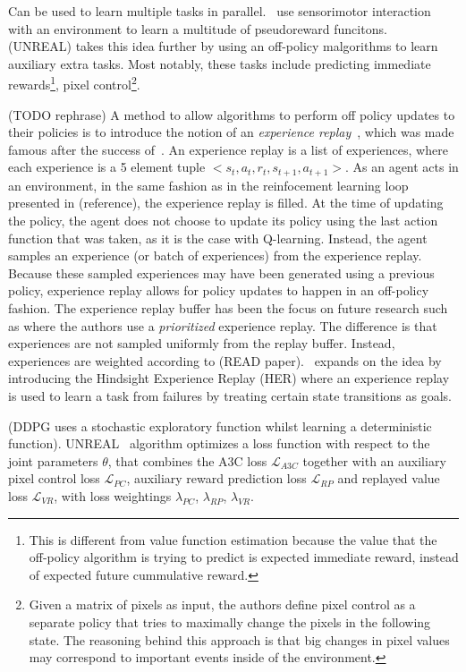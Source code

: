 \documentclass{../main.tex}{}
\begin{document}
Can be used to learn multiple tasks in parallel.~\cite{Sutton2010} use sensorimotor interaction with an environment to learn a multitude of pseudoreward funcitons.~\cite{Jaderberg2016} (UNREAL) takes this idea further by using an off-policy malgorithms to learn auxiliary extra tasks. Most notably, these tasks include predicting immediate rewards\footnote{This is different from value function estimation because the value that the off-policy algorithm is trying to predict is expected immediate reward, instead of expected future cummulative reward.}, pixel control\footnote{Given a matrix of pixels as input, the authors define pixel control as a separate policy that tries to maximally change the pixels in the following state. The reasoning behind this approach is that big changes in pixel values may correspond to important events inside of the environment.}.

(TODO rephrase)
A method to allow algorithms to perform off policy updates to their policies is to introduce the notion of an \textit{experience replay}~\citep{Lin1993}, which was made famous after the success of~\cite{Mnih2013}. An experience replay is a list of experiences, where each experience is a 5 element tuple $<s_t, a_t, r_t, s_{t+1}, a_{t+1}>$. As an agent acts in an environment, in the same fashion as in the reinfocement learning loop presented in (reference), the experience replay is filled. At the time of updating the policy, the agent does not choose to update its policy using the last action function that was taken, as it is the case with Q-learning. Instead, the agent samples an experience (or batch of experiences) from the experience replay. Because these sampled experiences may have been generated using a previous policy, experience replay allows for policy updates to happen in an off-policy fashion. The experience replay buffer has been the focus on future research such as \citep{Schaul2015, Hessel2017} where the authors use a \textit{prioritized} experience replay. The difference is that experiences are not sampled uniformly from the replay buffer. Instead, experiences are weighted according to (READ paper).~\cite{Andrychowicz2017} expands on the idea by introducing the Hindsight Experience Replay (HER) where an experience replay is used to learn a task from failures by treating certain state transitions as goals.

(DDPG uses a stochastic exploratory function whilst learning a deterministic function).
UNREAL~\citep{Jaderberg2016} algorithm optimizes a loss function with respect to the joint parameters $\theta$, that combines the A3C loss $\mathcal{L}_{A3C}$ together with an auxiliary pixel control loss $\mathcal{L}_{PC}$, auxiliary reward prediction loss $\mathcal{L}_{RP}$ and replayed value loss $\mathcal{L}_{VR}$, with loss weightings $\lambda_{PC}$, $\lambda_{RP}$, $\lambda_{VR}$.
\end{document}
